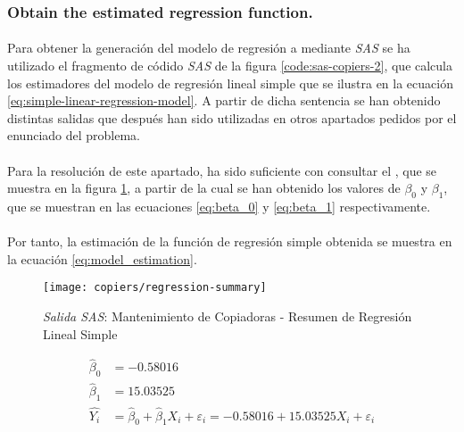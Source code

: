 \documentclass{article}
\begin{document}
      \subsubsection{Obtain the estimated regression function.}

        \paragraph{}
        Para obtener la generación del modelo de regresión a mediante \emph{SAS} se ha utilizado el fragmento de códido \emph{SAS} de la figura \ref{code:sas-copiers-2}, que calcula los estimadores del modelo de regresión lineal simple que se ilustra en la ecuación \eqref{eq:simple-linear-regression-model}. A partir de dicha sentencia se han obtenido distintas salidas que después han sido utilizadas en otros apartados pedidos por el enunciado del problema.

        \paragraph{}
        Para la resolución de este apartado, ha sido suficiente con consultar el , que se muestra en la figura \ref{img:copiers-regression-summary}, a partir de la cual se han obtenido los valores de $\beta_0$ y $\beta_1$, que se muestran en las ecuaciones \eqref{eq:beta_0} y \eqref{eq:beta_1} respectivamente.

        \paragraph{}
        Por tanto, la estimación de la función de regresión simple obtenida se muestra en la ecuación \eqref{eq:model_estimation}.

        \begin{figure}[!h]
          \centering
          \texttt{[image: copiers/regression-summary]}
          \caption{\emph{Salida SAS}: Mantenimiento de Copiadoras - Resumen de Regresión Lineal Simple}
          \label{img:copiers-regression-summary}
        \end{figure}

        \begin{align}
        \label{eq:beta_0}
          \widehat{\beta}_0 &= -0.58016\\
        \label{eq:beta_1}
          \widehat{\beta}_1 &= 15.03525\\
        \label{eq:model_estimation}
          \widehat{Y_i} &= \widehat{\beta}_0 +\widehat{\beta}_1X_i + \varepsilon_i = -0.58016 + 15.03525 X_i + \varepsilon_i
        \end{align}
\end{document}
